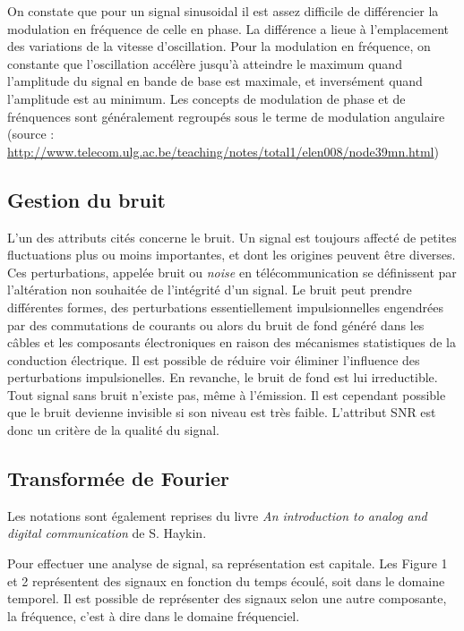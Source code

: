 On constate que pour un signal sinusoidal il est assez difficile de différencier la modulation en fréquence de celle en phase. La différence a lieue à l'emplacement des variations de la vitesse d'oscillation. Pour la modulation en fréquence, on constante que l'oscillation accélère jusqu'à atteindre le maximum quand l'amplitude du signal en bande de base est maximale, et inversément quand l'amplitude est au minimum. Les concepts de modulation de phase et de frénquences sont généralement regroupés sous le terme de modulation angulaire (source : \href{http://www.telecom.ulg.ac.be/teaching/notes/total1/elen008/node39_mn.html}{http://www.telecom.ulg.ac.be/teaching/notes/total1/elen008/node39mn.html})


\subsection{Gestion du bruit}

L'un des attributs cités concerne le bruit. Un signal est toujours affecté de petites fluctuations plus ou moins importantes, et dont les origines peuvent être diverses. Ces perturbations, appelée bruit ou \textit{noise} en télécommunication se définissent par l'altération non souhaitée de l'intégrité d'un signal. Le bruit peut prendre différentes formes, des perturbations essentiellement impulsionnelles engendrées par des commutations de courants ou alors du bruit de fond généré dans les câbles et les composants électroniques en raison
des mécanismes statistiques de la conduction électrique. Il est possible de réduire voir éliminer l'influence des perturbations impulsionelles. En revanche, le bruit de fond est lui irreductible. Tout signal sans bruit n'existe pas, même à l'émission. Il est cependant possible que le bruit devienne invisible si son niveau est très faible. L'attribut SNR est donc un critère de la qualité du signal.


\subsection{Transformée de Fourier}

Les notations sont également reprises du livre \textit{An introduction to analog and digital communication} de S. Haykin\cite{book1}.

\vspace{0.1cm}

Pour effectuer une analyse de signal, sa représentation est capitale. Les Figure 1 et 2 représentent des signaux en fonction du temps écoulé, soit dans le domaine temporel. Il est possible de représenter des signaux selon une autre composante, la fréquence, c'est à dire dans le domaine fréquenciel.

